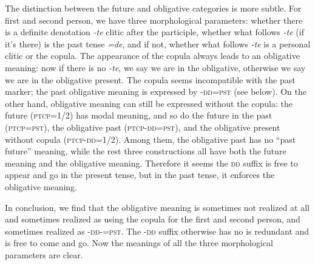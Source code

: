 \documentclass[a4paper, oneside, 12pt]{report}
\newcommand{\form}[1]{\emph{#1}}
\newcommand{\category}[1]{\textsc{#1}}
\begin{document}
The distinction between the future and obligative categories is more subtle.
For first and second person, 
we have three morphological parameters:
whether there is a definite denotation \form{-te} clitic after the participle, 
whether what follows \form{-te} (if it's there) is 
the past tense \form{=de},
and if not, whether what follows \form{-te} is a personal clitic 
or the copula.
The appearance of the copula always leads to an obligative meaning:
now if there is no \form{-te}, 
we say we are in the obligative, 
otherwise we say we are in the obligative present. 
The copula seems incompatible with the past marker;
the past obligative meaning is expressed by -\category{dd}=\category{pst}
(see below).
On the other hand, obligative meaning can still be expressed 
without the copula:
the future (\category{ptcp}=\category{1/2}) has modal meaning, 
and so do the future in the past (\category{ptcp}=\category{pst}),
the obligative past (\category{ptcp}-\category{dd}=\category{pst}), 
and the obligative present without copula (\category{ptcp}-\category{dd}=\category{1/2}).
Among them, the obligative past has no ``past future'' meaning, 
while the rest three constructions all have both the future meaning 
and the obligative meaning.
Therefore it seems the \category{dd} suffix is free to appear and go 
in the present tense, 
but in the past tense, it enforces the obligative meaning.

In conclusion, we find that the obligative meaning is sometimes not realized at all 
and sometimes realized as using the copula for the first and second person,
and sometimes realized as \category{-dd}-\category{=pst}.
The \category{-dd} suffix otherwise has no is redundant and is free to come and go.
Now the meanings of all the three morphological parameters are clear.



\end{document}
